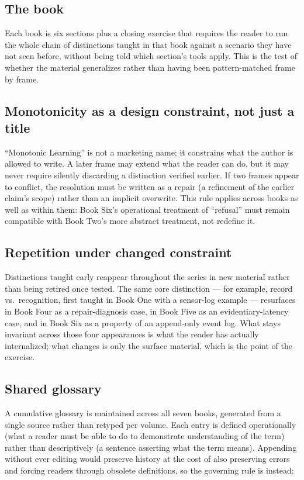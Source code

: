 \documentclass[11pt]{article}
\begin{document}
\subsection*{The book}
Each book is six sections plus a closing exercise that requires the reader to run the whole chain of distinctions taught in that book against a scenario they have not seen before, without being told which section's tools apply. This is the test of whether the material generalizes rather than having been pattern-matched frame by frame.

\subsection*{Monotonicity as a design constraint, not just a title}
``Monotonic Learning'' is not a marketing name; it constrains what the author is allowed to write. A later frame may extend what the reader can do, but it may never require silently discarding a distinction verified earlier. If two frames appear to conflict, the resolution must be written as a repair (a refinement of the earlier claim's scope) rather than an implicit overwrite. This rule applies across books as well as within them: Book Six's operational treatment of ``refusal'' must remain compatible with Book Two's more abstract treatment, not redefine it.

\subsection*{Repetition under changed constraint}
Distinctions taught early reappear throughout the series in new material rather than being retired once tested. The same core distinction --- for example, record vs.\ recognition, first taught in Book One with a sensor-log example --- resurfaces in Book Four as a repair-diagnosis case, in Book Five as an evidentiary-latency case, and in Book Six as a property of an append-only event log. What stays invariant across those four appearances is what the reader has actually internalized; what changes is only the surface material, which is the point of the exercise.

\subsection*{Shared glossary}
A cumulative glossary is maintained across all seven books, generated from a single source rather than retyped per volume. Each entry is defined operationally (what a reader must be able to do to demonstrate understanding of the term) rather than descriptively (a sentence asserting what the term means). Appending without ever editing would preserve history at the cost of also preserving errors and forcing readers through obsolete definitions, so the governing rule is instead:
\end{document}
